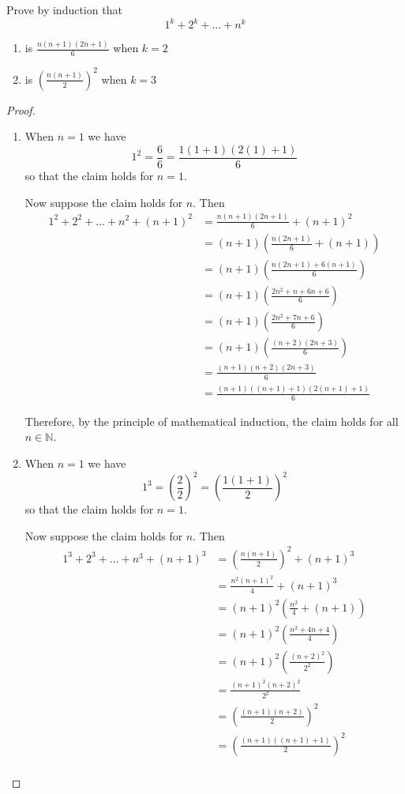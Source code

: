 \begin{exercise} \label{0.85}
	Prove by induction that 
	\[ 1^k + 2^k + \ldots + n^k \]
	\begin{enumerate}
	    \item is \( \frac{n(n+1)(2n+1)}{6} \) when \( k = 2 \)
	    \item is \( \left( \frac{n(n+1)}{2} \right)^2 \) when \( k = 3 \)
	\end{enumerate}
	
	\begin{proof}
	    \begin{enumerate}
	        \item When \( n = 1 \) we have
	        \[ 1^2 = \frac{6}{6} = \frac{1(1+1)(2(1)+1)}{6} \]
	        so that the claim holds for \( n = 1 \).
	        
	        Now suppose the claim holds for \( n \). Then
	        \begin{align*}
	            1^2 + 2^2 + \ldots + n^2 + (n+1)^2 &= \frac{n(n+1)(2n+1)}{6} + (n+1)^2 \\
	            &= (n+1) \left(\frac{n(2n+1)}{6} + (n+1)\right) \\
	            &=  (n+1) \left(\frac{n(2n+1)+6(n+1)}{6}\right) \\
	            &= (n+1) \left( \frac{2n^2+n+6n+6}{6} \right) \\
	            &= (n+1) \left( \frac{2n^2+7n+6}{6} \right) \\
	            &= (n+1) \left( \frac{(n+2)(2n+3)}{6} \right) \\
	            &= \frac{(n+1)(n+2)(2n+3)}{6} \\
	            &= \frac{(n+1)((n+1)+1)(2(n+1)+1)}{6}
	        \end{align*}
	        
	        Therefore, by the principle of mathematical induction, the claim holds for all \( n \in \mathbb{N} \).
	        
	        \item When \( n = 1 \) we have
	        \[ 1^3 = \left(\frac{2}{2}\right)^2 = \left( \frac{1(1+1)}{2} \right)^2 \]
	        so that the claim holds for \( n = 1 \).
	        
	        Now suppose the claim holds for \( n \). Then
	        \begin{align*}
	            1^3 + 2^3 + \ldots + n^3 + (n+1)^3 &= \left( \frac{n(n+1)}{2} \right)^2 + (n+1)^3 \\
	            &= \frac{n^2(n+1)^2}{4} + (n+1)^3 \\
	            &= (n+1)^2 \left( \frac{n^2}{4} + (n+1) \right) \\
	            &= (n+1)^2 \left( \frac{n^2+4n+4}{4} \right) \\
	            &= (n+1)^2 \left( \frac{(n+2)^2}{2^2} \right) \\
	            &= \frac{(n+1)^2(n+2)^2}{2^2} \\
	            &= \left( \frac{(n+1)(n+2)}{2} \right)^2 \\
	            &= \left( \frac{(n+1)((n+1)+1)}{2} \right)^2 \\
	        \end{align*}
	        

\end{enumerate}
\end{proof}
\end{exercise}
